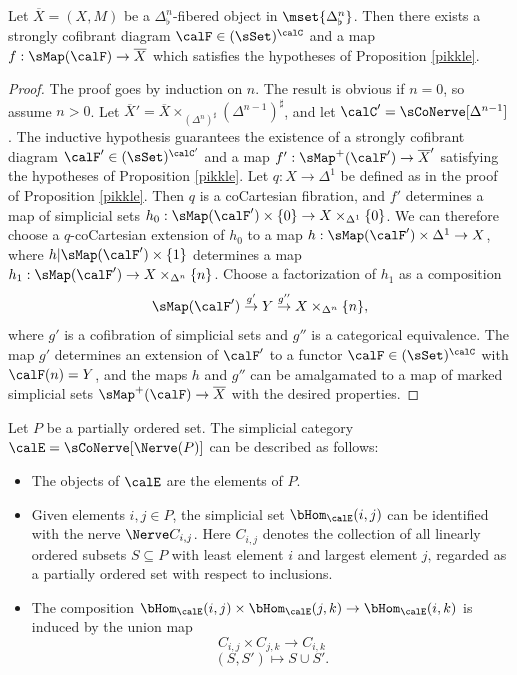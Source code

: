 \begin{proposition}\label{unple}
Let $\overline{X} = (X,M)$ be a $\Delta^{n}_{\flat}$-fibered object in $\mset{ \Delta^n_{\flat} }$. Then there exists a strongly cofibrant diagram $\calF \in (\sSet)^{\calC}$ and
a map $f: \sMap(\calF) \rightarrow \overline{X}$ which satisfies the hypotheses of Proposition
\ref{pikkle}.
\end{proposition}

\begin{proof}
The proof goes by induction on $n$. The result is obvious if $n=0$, so assume $n > 0$.
Let $\overline{X}' = \overline{X} \times_{ (\Delta^n)^{\sharp} } ( \Delta^{n-1} )^{\sharp}$, and let
$\calC' = \sCoNerve[ \Delta^{n-1}]$. The inductive hypothesis guarantees the existence of a strongly cofibrant diagram $\calF' \in (\sSet)^{\calC'}$ and a map $f': \sMap^{+}(\calF') \rightarrow \overline{X}'$
satisfying the hypotheses of Proposition \ref{pikkle}. Let $q: X \rightarrow \Delta^1$ be defined
as in the proof of Proposition \ref{pikkle}. Then $q$ is a coCartesian fibration, and $f'$ determines a map
of simplicial sets $h_0: \sMap(\calF') \times \{0\} \rightarrow X \times_{ \Delta^1 } \{0\}$. We can therefore choose a $q$-coCartesian extension of $h_0$ to a map $h: \sMap( \calF') \times \Delta^1 \rightarrow X$, 
where $h | \sMap(\calF') \times \{1\}$ determines a map $h_1: \sMap(\calF') \rightarrow X \times_{ \Delta^n} \{n\}$.
Choose a factorization of $h_1$ as a composition
$$ \sMap(\calF') \stackrel{g'}{\rightarrow} Y \stackrel{g''}{\rightarrow} X \times_{ \Delta^n} \{n\},$$
where $g'$ is a cofibration of simplicial sets and $g''$ is a categorical equivalence. The
map $g'$ determines an extension of $\calF'$ to a functor $\calF \in (\sSet)^{\calC}$ with
$\calF(n) = Y$, and the maps $h$ and $g''$ can be amalgamated to a map of marked
simplicial sets $\sMap^{+}(\calF) \rightarrow \overline{X}$ with the desired properties.
\end{proof}

\begin{remark}\label{scootnerve}
Let $P$ be a partially ordered set. The simplicial category
$\calE = \sCoNerve[ \Nerve(P) ]$ can be described as follows:
\begin{itemize}
\item[$(a)$] The objects of $\calE$ are the elements of $P$.
\item[$(b)$] Given elements $i,j \in P$, the simplicial set
$\bHom_{ \calE}(i,j)$ can be identified with the nerve $\Nerve C_{i,j}$. Here
$C_{i,j}$ denotes the collection of all linearly ordered subsets $S \subseteq P$ with
least element $i$ and largest element $j$, regarded as a partially ordered set
with respect to inclusions.
\item[$(c)$] The composition $\bHom_{\calE}(i,j) \times \bHom_{\calE}(j,k)
\rightarrow \bHom_{\calE}(i,k)$ is induced by the union map
$$ C_{i,j} \times C_{j,k} \rightarrow C_{i,k}$$
$$ (S, S') \mapsto S \cup S'.$$
\end{itemize}
\end{remark}

